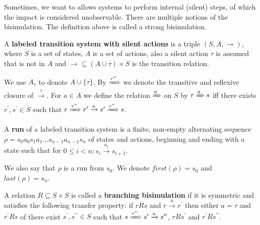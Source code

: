 Sometimes, we want to allows systems to perform internal (silent) steps, of which the impact is considered unobservable. There are multiple notions of the bisimulation. The definition above is called a strong bisimulation.

\begin{definition}
  A  {\bf labeled transition system with silent actions} is a triple $(S, A, \rightarrow)$, where $S$ is a set of states, $A$ is a set of actions, also a silent action $\tau$ is assumed that is not in $A$ and $\rightarrow\subseteq (A\cup\tau)\times S$ is the transition relation.
\end{definition}

We use $A_\tau$ to denote $A\cup\{\tau\}$.
By $\xRightarrow{\tau^*}$ we denote the transitive and reflexive closure of $\xrightarrow{\tau}$. For $a\in A$ we define the relation $\xRightarrow{a}$ on $S$ by $r\xRightarrow{a}s$ iff there exists $r^\prime, s^\prime\in S$ such that $r \xRightarrow{\tau^*} r^\prime \xrightarrow{a} s^\prime \xRightarrow{\tau^*} s$.

\begin{definition}
  A {\bf run} of a labeled transition system is a finite, non-empty alternating sequence $\rho = s_0a_0s_1a_1\ldots s_{n-1}a_{n-1}s_n$ of states and actions, beginning and ending with a state such that for $0\leq i<n: s_i\xrightarrow{a_i}s_{i+1}$.
\end{definition}

We also say that $\rho$ is a run from $s_0$. We denote $first(\rho)=s_0$ and $last(\rho)=s_n$.

\begin{definition}
  A relation $R\subseteq S\times S$ is called a  {\bf branching bisimulation} if it is symmetric and satisfies the following transfer property: if $rRs$ and $r\xrightarrow{a} r^\prime$ then either $a=\tau$ and $r^\prime Rs$ of there exist $s^\prime,s^{\prime\prime}\in S$ such that $s \xRightarrow{\tau^*} s^\prime \xrightarrow{a} s^{\prime\prime}$, $rRs^\prime$ and $r^\prime Rs^{\prime\prime}$.
\end{definition}

